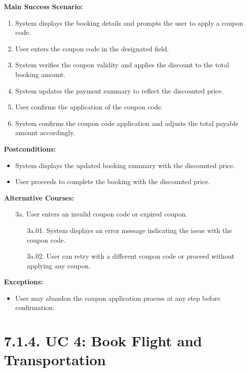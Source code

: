 \documentclass{scrreprt}
\begin{document}
\textbf{Main Success Scenario:}
\begin{enumerate}
    \item System displays the booking details and prompts the user to apply a coupon code.
    \item User enters the coupon code in the designated field.
    \item System verifies the coupon validity and applies the discount to the total booking amount.
    \item System updates the payment summary to reflect the discounted price.
    \item User confirms the application of the coupon code.
    \item System confirms the coupon code application and adjusts the total payable amount accordingly.
\end{enumerate}

\textbf{Postconditions:}
\begin{itemize}
    \item System displays the updated booking summary with the discounted price.
    \item User proceeds to complete the booking with the discounted price.
\end{itemize}

\textbf{Alternative Courses:}
\begin{itemize}
    \item[3a.] User enters an invalid coupon code or expired coupon.
    \begin{itemize}
        \item[3a.01.] System displays an error message indicating the issue with the coupon code.
        \item[3a.02.] User can retry with a different coupon code or proceed without applying any coupon.
    \end{itemize}
\end{itemize}

\textbf{Exceptions:}
\begin{itemize}
    \item User may abandon the coupon application process at any step before confirmation.
\end{itemize}


\section*{\textbf{7.1.4. UC 4: Book Flight and Transportation}}
\end{document}
